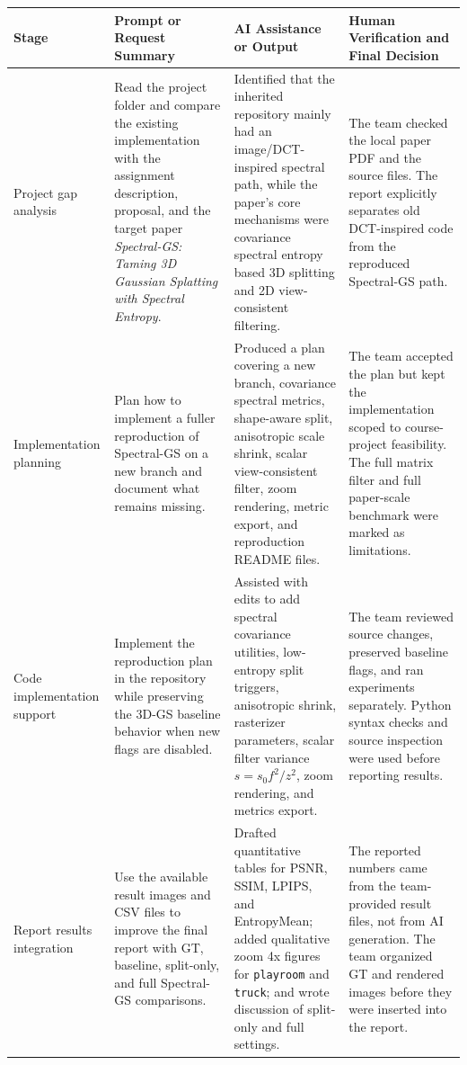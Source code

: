 \documentclass[10pt]{article}
\begin{document}
\small
\begin{tabularx}{\textwidth}{p{}Y Y Y}
\toprule
\textbf{Stage} & \textbf{Prompt or Request Summary} & \textbf{AI Assistance or Output} & \textbf{Human Verification and Final Decision} \\
\midrule
Project gap analysis &
Read the project folder and compare the existing implementation with the assignment description, proposal, and the target paper \emph{Spectral-GS: Taming 3D Gaussian Splatting with Spectral Entropy}. &
Identified that the inherited repository mainly had an image/DCT-inspired spectral path, while the paper's core mechanisms were covariance spectral entropy based 3D splitting and 2D view-consistent filtering. &
The team checked the local paper PDF and the source files. The report explicitly separates old DCT-inspired code from the reproduced Spectral-GS path. \\
\midrule
Implementation planning &
Plan how to implement a fuller reproduction of Spectral-GS on a new branch and document what remains missing. &
Produced a plan covering a new branch, covariance spectral metrics, shape-aware split, anisotropic scale shrink, scalar view-consistent filter, zoom rendering, metric export, and reproduction README files. &
The team accepted the plan but kept the implementation scoped to course-project feasibility. The full matrix filter and full paper-scale benchmark were marked as limitations. \\
\midrule
Code implementation support &
Implement the reproduction plan in the repository while preserving the 3D-GS baseline behavior when new flags are disabled. &
Assisted with edits to add spectral covariance utilities, low-entropy split triggers, anisotropic shrink, rasterizer parameters, scalar filter variance $s=s_0f^2/z^2$, zoom rendering, and metrics export. &
The team reviewed source changes, preserved baseline flags, and ran experiments separately. Python syntax checks and source inspection were used before reporting results. \\
\midrule
Report results integration &
Use the available result images and CSV files to improve the final report with GT, baseline, split-only, and full Spectral-GS comparisons. &
Drafted quantitative tables for PSNR, SSIM, LPIPS, and EntropyMean; added qualitative zoom 4x figures for \texttt{playroom} and \texttt{truck}; and wrote discussion of split-only and full settings. &
The reported numbers came from the team-provided result files, not from AI generation. The team organized GT and rendered images before they were inserted into the report. \\

\end{tabularx}
\end{document}
